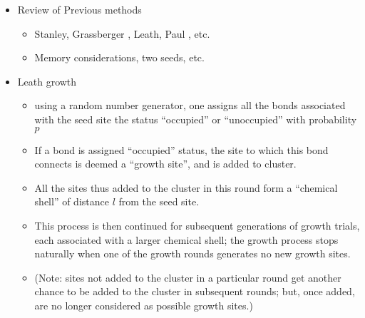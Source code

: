 \documentclass[11pt]{article}
\begin{document}
\begin{itemize}

\item Review of Previous methods\\
\label{sec-4.2.2.1}

\begin{itemize}

\item Stanley, Grassberger \cite{Gr99}, Leath, Paul \cite{Paul2001}, etc.\\
\label{sec-4.2.2.1.1}


\item Memory considerations, two seeds, etc.\\
\label{sec-4.2.2.1.2}

\end{itemize} %

\item Leath growth \cite{Leath}\\
\label{sec-4.2.2.2}

\begin{itemize}

\item using a random number generator, one assigns all the bonds associated with the seed site the status ``occupied'' or ``unoccupied'' with probability $p$\\
\label{sec-4.2.2.2.1}


\item If a bond is assigned ``occupied'' status, the site to which this bond connects is deemed a ``growth site'', and is added to cluster.\\
\label{sec-4.2.2.2.2}


\item All the sites thus added to the cluster in this round form a ``chemical shell'' of distance $l$ from the seed site.\\
\label{sec-4.2.2.2.3}


\item This process is then continued for subsequent generations of growth trials, each associated with a larger chemical shell; the growth process stops naturally when one of the growth rounds generates no new growth sites.\\
\label{sec-4.2.2.2.4}


\item (Note: sites not added to the cluster in a particular round get another chance to be added to the cluster in subsequent rounds; but, once added, are no longer considered as possible growth sites.)\\
\label{sec-4.2.2.2.5}


\end{itemize}
\end{itemize}
\end{document}
